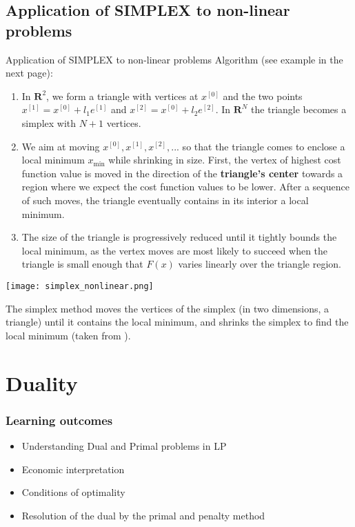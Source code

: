 \documentclass[c]{beamer}
\begin{document}
\subsection{Application of SIMPLEX to non-linear problems}


\begin{frame}{Application of SIMPLEX to non-linear problems}
  Algorithm (see example in the next page):
\begin{enumerate}
\item In $\mathbf{R}^2$, we form a triangle with vertices at $x^{[0]}$ and the two points $x^{[1]} = x^{[0]} + l_1e^{[1]}$ and  $x^{[2]} = x^{[0]} + l_2e^{[2]}$. In $\mathbf{R}^N$ the triangle becomes a simplex with $N + 1$ vertices.
\item We aim at moving ${x^{[0]}, x^{[1]}, x^{[2]},...}$ so that the triangle comes to enclose a local minimum $x_{\mathrm{min}}$ while shrinking in size.  First, the vertex of highest cost function value is moved in the direction of the {\bf triangle’s center} towards a region where we expect the cost function values to be lower. After a sequence of such moves, the triangle eventually contains in its interior a local minimum. 
\item The size of the triangle is progressively reduced until it tightly bounds the local minimum, as the vertex moves are most likely to succeed when the triangle is small enough that $F(x)$ varies linearly over the triangle region.
\end{enumerate}
\end{frame}

\begin{frame}
  \begin{center}
    \texttt{[image: simplex\_nonlinear.png]}
  \end{center}
  The simplex method moves the vertices of the simplex (in two dimensions, a triangle) until it contains the local minimum, and shrinks the simplex to find the local minimum (taken from \cite{beers}).
\end{frame}

\section{Duality}


\begin{frame}
\frametitle{Learning outcomes}
\begin{itemize}
  \item Understanding Dual and Primal problems in LP
  \item Economic interpretation
  \item Conditions of optimality
  \item Resolution of the dual by the primal and penalty method
\end{itemize}
\end{frame}
\end{document}
